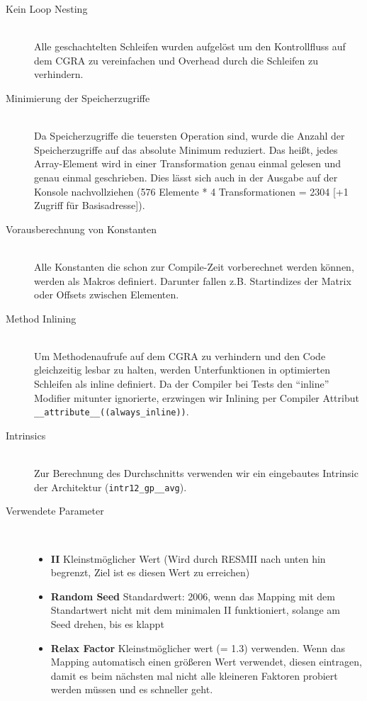 \documentclass[oneside,11pt,accentcolor=tud2b, nochapname]{tudexercise}
\begin{document}
\begin{description}	
	\item[Kein Loop Nesting] \hfill \\
	Alle geschachtelten Schleifen wurden aufgelöst um den Kontrollfluss auf dem CGRA zu vereinfachen und Overhead durch die Schleifen zu verhindern.\\
	
	\item[Minimierung der Speicherzugriffe] \hfill \\
	Da Speicherzugriffe die teuersten Operation sind, wurde die Anzahl der Speicherzugriffe auf das absolute Minimum reduziert.
	Das heißt, jedes Array-Element wird in einer Transformation genau einmal gelesen und genau einmal geschrieben.
	Dies lässt sich auch in der Ausgabe auf der Konsole nachvollziehen (576 Elemente * 4 Transformationen = 2304 [+1 Zugriff für Basisadresse]).\\
	
	\item[Vorausberechnung von Konstanten] \hfill \\
	Alle Konstanten die schon zur Compile-Zeit vorberechnet werden können, werden als Makros definiert. 
	Darunter fallen z.B. Startindizes der Matrix oder Offsets zwischen Elementen.\\
	
	\item[Method Inlining] \hfill \\
	Um Methodenaufrufe auf dem CGRA zu verhindern und den Code gleichzeitig lesbar zu halten, werden Unterfunktionen in optimierten Schleifen als inline definiert.
	Da der Compiler bei Tests den "`inline"' Modifier mitunter ignorierte, erzwingen wir  Inlining per Compiler Attribut \texttt{\_\_attribute\_\_((always\_inline))}.\\
	
	\item[Intrinsics] \hfill \\
	Zur Berechnung des Durchschnitts verwenden wir ein eingebautes Intrinsic der Architektur (\texttt{intr12\_gp\_\_avg}).\\
	
	\item[Verwendete Parameter] \hfill \\
	\begin{itemize}
		\item \textbf{II} Kleinstmöglicher Wert (Wird durch RESMII nach unten hin begrenzt, Ziel ist es diesen Wert zu erreichen)
		\item \textbf{Random Seed} Standardwert: 2006, wenn das Mapping mit dem Standartwert nicht mit dem minimalen II funktioniert, solange am Seed drehen, bis es klappt
		\item \textbf{Relax Factor} Kleinstmöglicher wert (= 1.3) verwenden.
			Wenn das Mapping automatisch einen größeren Wert verwendet, diesen eintragen, damit es beim nächsten mal nicht alle kleineren Faktoren probiert werden müssen und es schneller geht.
	\end{itemize}
	

\end{description}
\end{document}
